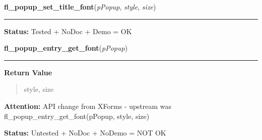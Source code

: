     \label{xformslib:flpopup:fl_popup_set_title_font}

    \vspace{0.5ex}

\hspace{.8\funcindent}\begin{boxedminipage}{\funcwidth}

    \raggedright \textbf{fl\_popup\_set\_title\_font}(\textit{pPopup}, \textit{style}, \textit{size})

    \vspace{-1.5ex}

    \rule{\textwidth}{0.5\fboxrule}
\setlength{\parskip}{2ex}
\setlength{\parskip}{1ex}
\textbf{Status:} Tested + NoDoc + Demo = OK



    \end{boxedminipage}

    \label{xformslib:flpopup:fl_popup_entry_get_font}

    \vspace{0.5ex}

\hspace{.8\funcindent}\begin{boxedminipage}{\funcwidth}

    \raggedright \textbf{fl\_popup\_entry\_get\_font}(\textit{pPopup})

    \vspace{-1.5ex}

    \rule{\textwidth}{0.5\fboxrule}
\setlength{\parskip}{2ex}
\setlength{\parskip}{1ex}
      \textbf{Return Value}
    \vspace{-1ex}

      \begin{quote}
      style, size

      \end{quote}

\textbf{Attention:} API change from XForms - upstream was fl\_popup\_entry\_get\_font(pPopup, 
style, size)



\textbf{Status:} Untested + NoDoc + NoDemo = NOT OK



    \end{boxedminipage}

